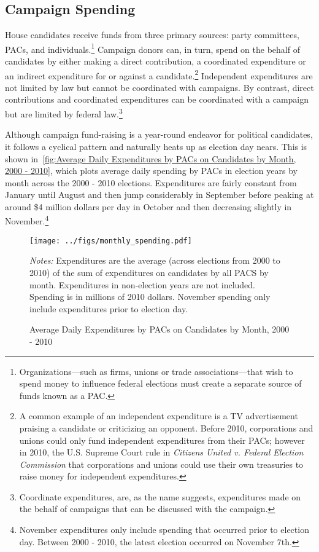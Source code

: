 \documentclass[12pt,final,fleqn]{article}
\theoremstyle{plain}
\begin{document}
\subsection{Campaign Spending} \label{sec: campaign spending}
House candidates receive funds from three primary sources: party committees, PACs, and individuals.\footnote{Organizations---such as firms, unions or trade associations---that wish to spend money to influence federal elections must create a separate source of funds known as a PAC.} Campaign donors can, in turn, spend on the behalf of candidates by either making a direct contribution, a coordinated expenditure or an indirect expenditure for or against a candidate.\footnote{A common example of an independent expenditure is a TV advertisement praising a candidate or criticizing an opponent. Before 2010, corporations and unions could only fund independent expenditures from their PACs; however in 2010, the U.S. Supreme Court rule in \emph{Citizens United v. Federal Election Commission} that corporations and unions could use their own treasuries to raise money for independent expenditures.} Independent expenditures are not limited by law but cannot be coordinated with campaigns. By contrast, direct contributions and coordinated expenditures can be coordinated with a campaign but are limited by federal law.\footnote{Coordinate expenditures, are, as the name suggests, expenditures made on the behalf of campaigns that can be discussed with the campaign.}

Although campaign fund-raising is a year-round endeavor for political candidates, it follows a cyclical pattern and naturally heats up as election day nears. This is shown in~\autoref{fig:Average Daily Expenditures by PACs on Candidates by Month, 2000 - 2010}, which plots average daily spending by PACs in election years by month across the 2000 - 2010 elections. Expenditures are fairly constant from January until August and then jump considerably in September before peaking at around \$4 million dollars per day in October and then decreasing slightly in November.\footnote{November expenditures only include spending that occurred prior to election day. Between 2000 - 2010, the latest election occurred on November 7th.} 

\begin{figure}[!htb]
\centering
\texttt{[image: ../figs/monthly\_spending.pdf]}
\vspace{.5cm}
\caption{Average Daily Expenditures by PACs on Candidates by Month, 2000 - 2010}
\label{fig:Average Daily Expenditures by PACs on Candidates by Month, 2000 - 2010}
\begin{minipage}{\linewidth}
\footnotesize
\emph{Notes:} Expenditures are the average (across elections from 2000 to 2010) of the sum of expenditures on candidates by all PACS by month. Expenditures in non-election years are not included. Spending is in millions of 2010 dollars. November spending only include expenditures prior to election day. 
\end{minipage}
\end{figure}
\end{document}
